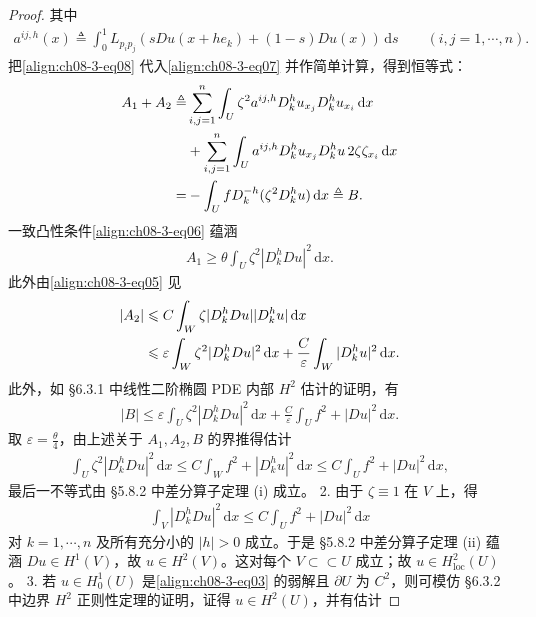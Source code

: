 \documentclass[../../main.tex]{subfiles}
\begin{document}
\begin{theorem}[极小元的二阶导数]
\begin{proof}
其中
\begin{align}
a^{ij,h}(x)\triangleq\int_0^1 L_{p_ip_j}(sDu(x+he_k)+(1-s)Du(x))\,\mathrm{d}s\qquad (i,j=1,\cdots,n).\label{align:ch08-3-eq09}
\end{align}
把\eqref{align:ch08-3-eq08} 代入\eqref{align:ch08-3-eq07} 并作简单计算，得到恒等式：
\begin{align}
A_1+A_2\triangleq&\sum_{i,j=1}^n\int_U\zeta^2 a^{ij,h}D_k^h u_{x_j}D_k^h u_{x_i}\,\mathrm{d}x\notag\\
&+\sum_{i,j=1}^n\int_U a^{ij,h}D_k^h u_{x_j}D_k^h u\,2\zeta\zeta_{x_i}\,\mathrm{d}x\notag\\
=&-\int_U fD_k^{-h}(\zeta^2 D_k^h u)\,\mathrm{d}x\triangleq B.\label{align:ch08-3-eq10}
\end{align}
一致凸性条件\eqref{align:ch08-3-eq06} 蕴涵
\begin{align}
A_1\geqslant\theta\int_U\zeta^2|D_k^h Du|^2\,\mathrm{d}x.\label{align:ch08-3-eq11}
\end{align}
此外由\eqref{align:ch08-3-eq05} 见
\begin{align}
|A_2|&\leqslant C\int_W\zeta|D_k^h Du||D_k^h u|\,\mathrm{d}x\notag\\
&\leqslant\varepsilon\int_W\zeta^2|D_k^h Du|^2\,\mathrm{d}x+\frac{C}{\varepsilon}\int_W|D_k^h u|^2\,\mathrm{d}x.\label{align:ch08-3-eq12}
\end{align}
此外，如 \S6.3.1 中线性二阶椭圆 PDE 内部 $H^2$ 估计的证明，有
\begin{align*}
|B|\leqslant\varepsilon\int_U\zeta^2|D_k^h Du|^2\,\mathrm{d}x+\frac{C}{\varepsilon}\int_U f^2+|Du|^2\,\mathrm{d}x.
\end{align*}
取 $\varepsilon=\frac\theta4$，由上述关于 $A_1,A_2,B$ 的界推得估计
\begin{align*}
\int_U\zeta^2|D_k^h Du|^2\,\mathrm{d}x\leqslant C\int_W f^2+|D_k^h u|^2\,\mathrm{d}x\leqslant C\int_U f^2+|Du|^2\,\mathrm{d}x,
\end{align*}
最后一不等式由 \S5.8.2 中差分算子定理 (i) 成立。
2. 由于 $\zeta\equiv 1$ 在 $V$ 上，得
\begin{align*}
\int_V|D_k^h Du|^2\,\mathrm{d}x\leqslant C\int_U f^2+|Du|^2\,\mathrm{d}x
\end{align*}
对 $k=1,\cdots,n$ 及所有充分小的 $|h|>0$ 成立。于是 \S5.8.2 中差分算子定理 (ii) 蕴涵 $Du\in H^1(V)$，故 $u\in H^2(V)$。这对每个 $V\subset \subset U$ 成立；故 $u\in H^2_{\mathrm{loc}}(U)$。
3. 若 $u\in H_0^1(U)$ 是\eqref{align:ch08-3-eq03} 的弱解且 $\partial U$ 为 $C^2$，则可模仿 \S6.3.2 中边界 $H^2$ 正则性定理的证明，证得 $u\in H^2(U)$，并有估计

\end{proof}
\end{theorem}
\end{document}
